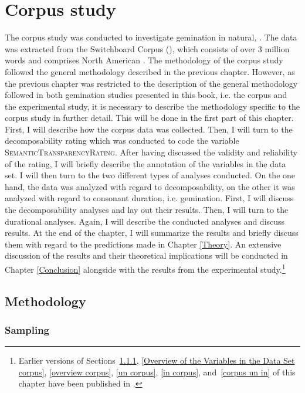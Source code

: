 \chapter {Corpus study}
\label{Corpus Studies}


The corpus study was conducted to investigate {gemination} in natural, . 
The data was extracted from the Switchboard Corpus (\citealt{Godfrey.1997}), which consists of over 3 million words and comprises North American . 
The methodology of the corpus study followed the general methodology described in the previous chapter. However, as the previous chapter was restricted to the description of the general methodology followed in both {gemination} studies presented in this book, i.e. the corpus and the experimental study,  it is necessary to describe the methodology specific to the corpus study in further detail. This will be done in the first part of this chapter.
 First, I will describe how the corpus data was collected. Then, I will turn to the decomposability rating which was conducted to code the variable \textsc{SemanticTransparencyRating}. After having discussed the validity and reliability of the rating, I will briefly describe the annotation of the variables in the data set. I will then turn to the two different types of analyses conducted.
 On the one hand, the data was analyzed with regard to {decomposability}, on the other it was analyzed with regard to consonant duration, i.e. {gemination}. 
First, I will discuss the {decomposability} analyses and lay out their results. 
Then, I will turn to the durational analyses. Again, I will describe the conducted analyses and discuss results.  At the end of the chapter, I will summarize the results and briefly discuss them with regard to the predictions made in Chapter \ref{Theory}. An extensive discussion of the results and their theoretical implications will be conducted in Chapter \ref{Conclusion} alongside with the results from the experimental study.\footnote{Earlier versions of Sections~\ref{sampling corpus},  \ref{Overview of the Variables in the Data Set corpus}, \ref{overview corpus}, \ref{un corpus}, \ref{in corpus}, and~\ref{corpus un in} of this chapter have been published in \cite{BenHedia.2017}.} 


\section{Methodology}

\subsection{Sampling}\label{sampling corpus}

